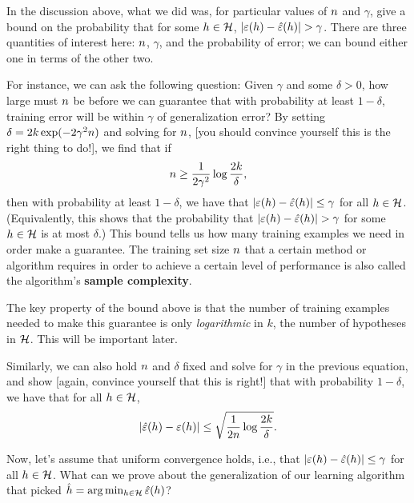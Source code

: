\documentclass{article} %
\begin{document}
In the discussion above, what we did was, for particular values
of ${n}$ and $\gamma$, give a bound on
the probability that for some $h \in {\cal H}$,  $|\varepsilon(h) - \hat\varepsilon(h)| > \gamma$.
There are three quantities of interest here: ${n}$, $\gamma$, and the probability of
error; we can bound either one in terms of the other two.

For instance, we can ask the following question: Given $\gamma$ and some $\delta > 0$,
how large must ${n}$ be before we can guarantee that with probability at least $1-\delta$, training
error will be within $\gamma$ of generalization error?
By setting $\delta = 2k\exp(-2\gamma^2{n})$ and solving for ${n}$,
[you should convince yourself this is the right thing to do!],
we find that if
\[
{n} \geq \frac{1}{2\gamma^2} \log \frac{2k}{\delta},
\]
then with probability at least $1-\delta$,  we have that $|\varepsilon(h) - \hat\varepsilon(h)| \leq \gamma$
for all $h \in {\cal H}$.  (Equivalently, this shows that the probability that
$|\varepsilon(h) - \hat\varepsilon(h)| > \gamma$ for some $h \in {\cal H}$ is at most $\delta$.)
This bound tells us how many training examples we need in order make
a guarantee.  The training set size ${n}$ that a certain method or algorithm
requires in order to achieve a certain level of performance is also called
the algorithm's {\bf sample complexity}.

The key property of the bound above is that the number of training examples
needed to make this guarantee is only \emph{logarithmic} in $k$,
the number of hypotheses in ${\cal H}$.  This will be important later.

Similarly, we can also hold ${n}$ and $\delta$ fixed and solve for $\gamma$
in the previous equation,
and show [again, convince yourself that this is right!] that with probability $1-\delta$, we
have that for all $h \in {\cal H}$,
\[
|\hat\varepsilon(h) - \varepsilon(h)| \leq \sqrt{\frac{1}{2{n}}\log\frac{2k}{\delta}}.
\]

Now, let's assume that uniform convergence holds, i.e., that
$|\varepsilon(h) - \hat\varepsilon(h)| \leq \gamma$ for all $h \in {\cal H}$.  What can we prove about
the generalization of our learning algorithm that picked $\hat{h} = \arg \min_{h \in {\cal H}}\hat\varepsilon(h)$?
\end{document}
